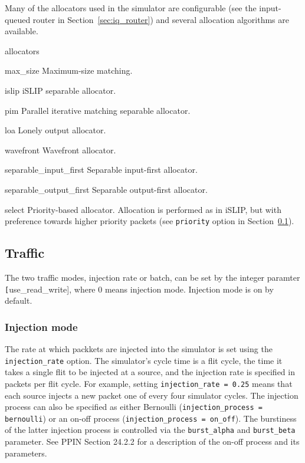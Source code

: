\documentclass[11pt]{article}
\begin{document}
Many of the allocators used in the simulator are configurable (see
the input-queued router in Section~\ref{sec:iq_router}) and several
allocation algorithms are available.

\begin{opt_list}{allocators}

\item[max\_size] Maximum-size matching. 
\item[islip] iSLIP separable allocator.
\item[pim] Parallel iterative matching separable allocator.
\item[loa] Lonely output allocator.
\item[wavefront] Wavefront allocator.
\item[separable\_input\_first] Separable input-first allocator.
\item[separable\_output\_first] Separable output-first allocator.
\item[select] Priority-based allocator.  Allocation is performed as in
iSLIP, but with preference towards higher priority packets (see
\texttt{priority} option in Section~\ref{sec:traffic}).

\end{opt_list}

\subsection{Traffic}
\label{sec:traffic}


The two traffic modes, injection rate or batch, can be set by the integer paramter \texttt[use\_read\_write], where 0 means injection mode. Injection mode is on by default.

\subsubsection{Injection mode}
The rate at which packkets are injected into the simulator is set using
the \texttt{injection\_rate} option.  The simulator's cycle time is a
flit cycle, the time it takes a single flit to be injected at a
source, and the injection rate is specified in packets per flit cycle.
For example, setting \texttt{injection\_rate = 0.25} means that each
source injects a new packet one of every four simulator cycles.  The
injection process can also be specified as either Bernoulli
(\texttt{injection\_process = bernoulli}) or an on-off process
(\texttt{injection\_process = on\_off}).  The burstiness of the latter
injection process is controlled via the \texttt{burst\_alpha} and
\texttt{burst\_beta} parameter.  See PPIN Section 24.2.2 for a
description of the on-off process and its parameters.
\end{document}
